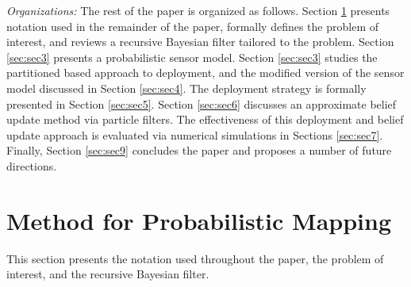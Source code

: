 \documentclass[letterpaper, 10 pt, conference]{ieeeconf}
\begin{document}
\textit{Organizations:}
The rest of the paper is organized as follows. 
Section \ref{sec:sec2} presents notation used in the remainder of the paper, formally defines the problem of interest, and reviews a recursive Bayesian filter tailored to the problem.
Section \ref{sec:sec3} presents a probabilistic sensor model.
Section \ref{sec:sec3} studies the partitioned based approach to deployment, and the modified version of the sensor model discussed in Section \ref{sec:sec4}. 
The deployment strategy is formally presented in Section \ref{sec:sec5}. 
Section \ref{sec:sec6} discusses an approximate belief update method via particle filters.
The effectiveness of this deployment and belief update approach is evaluated via numerical simulations in Sections \ref{sec:sec7}.
Finally, Section \ref{sec:sec9} concludes the paper and proposes a number of future directions.





\section{Method for Probabilistic Mapping}
\label{sec:sec2}

This section presents the notation used throughout the paper, the problem of interest, and the recursive Bayesian filter.

\end{document}
